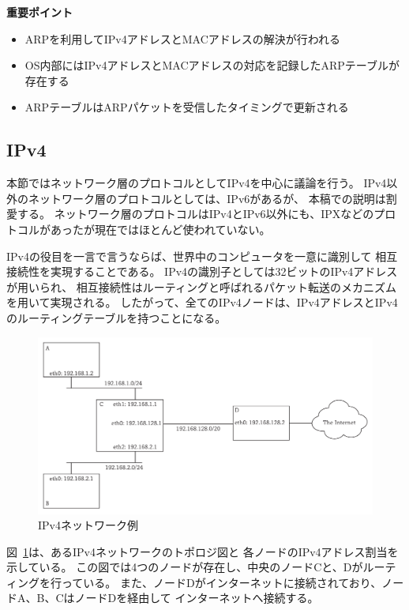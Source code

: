\begin{itembox}[l]{\bf 重要ポイント}
    \begin{itemize}
        \item ARPを利用してIPv4アドレスとMACアドレスの解決が行われる
        \item OS内部にはIPv4アドレスとMACアドレスの対応を記録したARPテーブルが存在する
        \item ARPテーブルはARPパケットを受信したタイミングで更新される
    \end{itemize}
\end{itembox}

\subsection{IPv4} \label{sec:network}

本節ではネットワーク層のプロトコルとしてIPv4を中心に議論を行う。
IPv4以外のネットワーク層のプロトコルとしては、IPv6があるが、
本稿での説明は割愛する。
ネットワーク層のプロトコルはIPv4とIPv6以外にも、IPXなどのプロトコルがあったが現在ではほとんど使われていない。

IPv4の役目を一言で言うならば、世界中のコンピュータを一意に識別して
相互接続性を実現することである。
IPv4の識別子としては32ビットのIPv4アドレスが用いられ、
相互接続性はルーティングと呼ばれるパケット転送のメカニズムを用いて実現される。
したがって、全てのIPv4ノードは、IPv4アドレスとIPv4のルーティングテーブルを持つことになる。

\begin{figure}[tb]
    \centering
    \includegraphics[width=15cm,pagebox=artbox]{figs/routing.pdf}
    \caption{IPv4ネットワーク例}
    \label{fig:routing}
\end{figure}

図~\ref{fig:routing}は、あるIPv4ネットワークのトポロジ図と
各ノードのIPv4アドレス割当を示している。
この図では4つのノードが存在し、中央のノードCと、Dがルーティングを行っている。
また、ノードDがインターネットに接続されており、ノードA、B、CはノードDを経由して
インターネットへ接続する。

